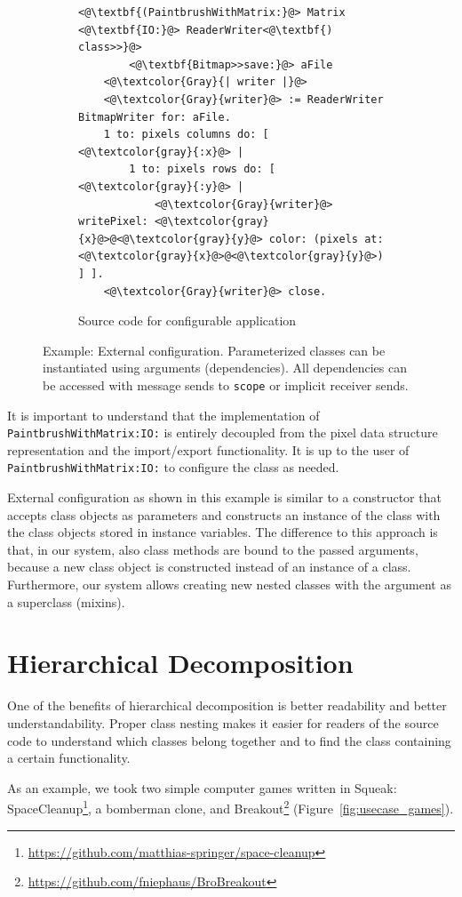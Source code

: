 \begin{figure}[!htp]
\begin{subfigure}[b]{\textwidth}
\begin{lstlisting}
<@\textbf{(PaintbrushWithMatrix:}@> Matrix <@\textbf{IO:}@> ReaderWriter<@\textbf{) class>>}@>
        <@\textbf{Bitmap>>save:}@> aFile
    <@\textcolor{Gray}{| writer |}@>
    <@\textcolor{Gray}{writer}@> := ReaderWriter BitmapWriter for: aFile.
    1 to: pixels columns do: [ <@\textcolor{gray}{:x}@> |
        1 to: pixels rows do: [ <@\textcolor{gray}{:y}@> | 
            <@\textcolor{Gray}{writer}@> writePixel: <@\textcolor{gray}{x}@>@<@\textcolor{gray}{y}@> color: (pixels at: <@\textcolor{gray}{x}@>@<@\textcolor{gray}{y}@>) ] ].
    <@\textcolor{Gray}{writer}@> close.
\end{lstlisting}
\caption{Source code for configurable application}
\end{subfigure}
\caption[Example: External configuration]{Example: External configuration. Parameterized classes can be instantiated using arguments (dependencies). All dependencies can be accessed with message sends to \texttt{scope} or implicit receiver sends.}
\label{fig:use_paintbrush}
\end{figure}

It is important to understand that the implementation of \texttt{PaintbrushWithMatrix:IO:} is entirely decoupled from the pixel data structure representation and the import/export functionality. It is up to the user of \texttt{PaintbrushWithMatrix:IO:} to configure the class as needed.

External configuration as shown in this example is similar to a constructor that accepts class objects as parameters and constructs an instance of the class with the class objects stored in instance variables. The difference to this approach is that, in our system, also class methods are bound to the passed arguments, because a new class object is constructed instead of an instance of a class. Furthermore, our system allows creating new nested classes with the argument as a superclass (mixins).

\section{Hierarchical Decomposition}
\label{sec:usecase_hierach_decomp}
One of the benefits of hierarchical decomposition is better readability and better understandability. Proper class nesting makes it easier for readers of the source code to understand which classes belong together and to find the class containing a certain functionality.

As an example, we took two simple computer games written in Squeak: SpaceCleanup\footnote{\url{https://github.com/matthias-springer/space-cleanup}}, a bomberman clone, and Breakout\footnote{\url{https://github.com/fniephaus/BroBreakout}} (Figure~\ref{fig:usecase_games}).

